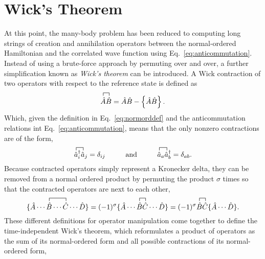\documentclass[thesis.tex]{subfiles}
\begin{document}
\section{Wick's Theorem} \label{section:wicks_theorem}
At this point, the many-body problem has been reduced to computing long strings of creation and annihilation operators between the normal-ordered Hamiltonian and the correlated wave function using Eq.\ \eqref{eq:anticommutation}.  Instead of using a brute-force approach by permuting over and over, a further simplification known as \textit{Wick's theorem} \cite{WICK1950} can be introduced.  A Wick contraction of two operators with respect to the reference state is defined as
\begin{equation} \label{eq:wick1}
  \contraction[1.0ex]{}{\hat{A}}{}{\hat{B}}
  \hat{A}\hat{B} = \hat{A}\hat{B} - \normord{\hat{A}\hat{B}}.
\end{equation}
Which, given the definition in Eq.\ \eqref{eq:normorddef} and the anticommutation relations int Eq.\ \eqref{eq:anticommutation}, means that the only nonzero contractions are of the form,
\begin{equation} \label{eq:wick2}
  \contraction[1.0ex]{}{\hat{a}}{^{\dagger}_{i}}{\hat{a}}
  \hat{a}^{\dagger}_{i}\hat{a}_{j} = \delta_{ij} \hspace{1.0cm} \text{and} \hspace{1.0cm}
  \contraction[1.0ex]{}{\hat{a}}{_{a}}{\hat{a}}
  \hat{a}_{a}\hat{a}_{b}^{\dagger} = \delta_{ab}.
\end{equation}
Because contracted operators simply represent a Kronecker delta, they can be removed from a normal ordered product by permuting the product $\sigma$ times so that the contracted operators are next to each other,
\begin{equation} \label{eq:wick3}
  \contraction[1.0ex]{\{ \hat{A}\cdots}{\hat{B}}{\cdots}{\hat{C}}
  \{ \hat{A}\cdots\hat{B}\cdots\hat{C}\cdots\hat{D} \} = (-1)^{\sigma}
  \contraction[1.0ex]{\{ \hat{A}\cdots}{\hat{B}}{}{\hat{C}}
  \{ \hat{A}\cdots\hat{B}\hat{C}\cdots\hat{D} \} = (-1)^{\sigma}
  \contraction[1.0ex]{}{\hat{B}}{}{\hat{C}}
  \hat{B}\hat{C}\{ \hat{A}\cdots\hat{D} \}.
\end{equation}
These different definitions for operator manipulation come together to define the time-independent Wick's theorem, which reformulates a product of operators as the sum of its normal-ordered form and all possible contractions of its normal-ordered form,
\end{document}
